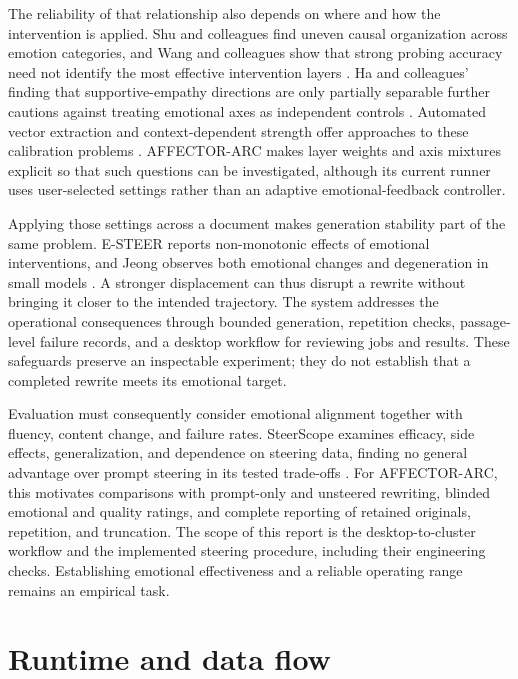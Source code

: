 \documentclass[manuscript,screen,nonacm]{acmart}
\begin{document}
The reliability of that relationship also depends on where and how the intervention is applied. Shu and colleagues find uneven causal organization across emotion categories, and Wang and colleagues show that strong probing accuracy need not identify the most effective intervention layers \cite{shu2026emotion,wang2026readbest}. Ha and colleagues' finding that supportive-empathy directions are only partially separable further cautions against treating emotional axes as independent controls \cite{ha2026empathy}. Automated vector extraction and context-dependent strength offer approaches to these calibration problems \cite{cui2025pas,ferrando2025dsas}. AFFECTOR-ARC makes layer weights and axis mixtures explicit so that such questions can be investigated, although its current runner uses user-selected settings rather than an adaptive emotional-feedback controller.

Applying those settings across a document makes generation stability part of the same problem. E-STEER reports non-monotonic effects of emotional interventions, and Jeong observes both emotional changes and degeneration in small models \cite{sun2026emotion,jeong2026emotion}. A stronger displacement can thus disrupt a rewrite without bringing it closer to the intended trajectory. The system addresses the operational consequences through bounded generation, repetition checks, passage-level failure records, and a desktop workflow for reviewing jobs and results. These safeguards preserve an inspectable experiment; they do not establish that a completed rewrite meets its emotional target.

Evaluation must consequently consider emotional alignment together with fluency, content change, and failure rates. SteerScope examines efficacy, side effects, generalization, and dependence on steering data, finding no general advantage over prompt steering in its tested trade-offs \cite{yang2026steerscope}. For AFFECTOR-ARC, this motivates comparisons with prompt-only and unsteered rewriting, blinded emotional and quality ratings, and complete reporting of retained originals, repetition, and truncation. The scope of this report is the desktop-to-cluster workflow and the implemented steering procedure, including their engineering checks. Establishing emotional effectiveness and a reliable operating range remains an empirical task.

\section{Runtime and data flow}\label{runtime-and-data-flow}
\end{document}
